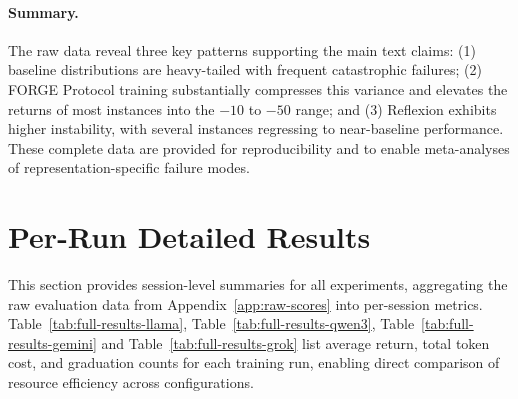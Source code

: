 \documentclass[sigconf]{acmart}
\begin{document}
\paragraph{Summary.} The raw data reveal three key patterns supporting the main text claims: (1) baseline distributions are heavy-tailed with frequent catastrophic failures; (2) FORGE Protocol training substantially compresses this variance and elevates the returns of most instances into the $-10$ to $-50$ range; and (3) Reflexion exhibits higher instability, with several instances regressing to near-baseline performance. These complete data are provided for reproducibility and to enable meta-analyses of representation-specific failure modes.

\section{Per-Run Detailed Results}
\label{app:results}
This section provides session-level summaries for all experiments, aggregating the raw evaluation data from Appendix~\ref{app:raw-scores} into per-session metrics. Table~\ref{tab:full-results-llama}, Table~\ref{tab:full-results-qwen3}, Table~\ref{tab:full-results-gemini} and Table~\ref{tab:full-results-grok} list average return, total token cost, and graduation counts for each training run, enabling direct comparison of resource efficiency across configurations.
\end{document}
